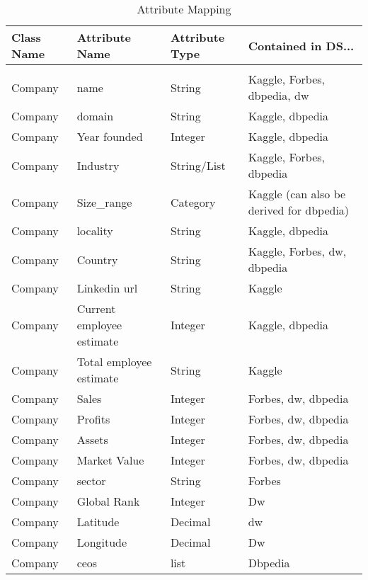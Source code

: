 \documentclass[11pt,titlepage,oneside,openany]{book}
\begin{document}
\begin{table}[t]
	\small
	\label{tab:attribute-mapping}
	\begin{tabularx}{\textwidth}{llll}
		Class Name   & Attribute   Name            & Attribute Type & Contained in DS... \\\hline
		&&&\\
		Company      & name                        & String         & Kaggle, Forbes,   dbpedia, dw              \\
		Company      & domain                      & String         & Kaggle, dbpedia                            \\
		Company & Year founded                & Integer        & Kaggle, dbpedia                            \\
		Company      & Industry                    & String/List    & Kaggle, Forbes, dbpedia                    \\
		Company      & Size\_range                 & Category       & Kaggle (can also be   derived for dbpedia) \\
		Company      & locality                    & String         & Kaggle, dbpedia                            \\
		Company      & Country                     & String         & Kaggle, Forbes, dw,   dbpedia              \\
		Company      & Linkedin url                & String         & Kaggle                                     \\
		Company      & Current   employee estimate & Integer        & Kaggle, dbpedia                            \\
		Company      & Total employee   estimate   & String         & Kaggle                                     \\
		Company      & Sales                       & Integer        & Forbes, dw, dbpedia                        \\
		Company      & Profits                     & Integer        & Forbes, dw, dbpedia                        \\
		Company      & Assets                      & Integer        & Forbes, dw, dbpedia                        \\
		Company      & Market Value                & Integer        & Forbes, dw, dbpedia                        \\
		Company      & sector                      & String         & Forbes                                     \\
		Company      & Global Rank                 & Integer        & Dw                                         \\
		Company      & Latitude                    & Decimal        & dw                                         \\
		Company      & Longitude                   & Decimal        & Dw                                         \\
		Company      & ceos                        & list           & Dbpedia                                   
	\end{tabularx}
\caption{Attribute Mapping}
\end{table}
\end{document}
